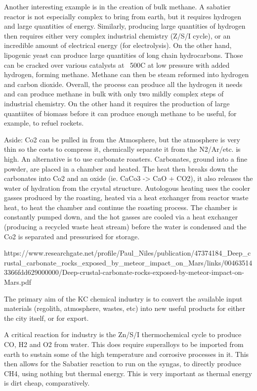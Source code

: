 \documentclass[10pt]{article}
\begin{document}
Another interesting example is in the creation of bulk methane. A sabatier reactor is not especially complex to bring from earth, but it requires hydrogen and large quantities of energy. Similarly, producing large quantities of hydrogen then requires either very complex industrial chemistry (Z/S/I cycle), or an incredible amount of electrical energy (for electrolysis). On the other hand, lipogenic yeast can produce large quantities of long chain hydrocarbons. Those can be cracked over various catalysts at ~500C at low pressure with added hydrogen, forming methane. Methane can then be steam reformed into hydrogen and carbon dioxide. Overall, the process can produce all the hydrogen it needs and can produce methane in bulk with only two mildly complex steps of industrial chemistry. On the other hand it requires the production of large quantiites of biomass before it can produce enough methane to be useful, for example, to refuel rockets.


Aside:
Co2 can be pulled in from the Atmosphere, but the atmosphere is very thin so the costs to compress it, chemically separate it from the N2/Ar/etc. is high. An alternative is to use carbonate roasters. Carbonates, ground into a fine powder, are placed in a chamber and heated. The heat then breaks down the carbonates into Co2 and an oxide (ie. CaCo3 -> CaO + CO2), it also releases the water of hydration from the crystal structure. Autologous heating uses the cooler gasses produced by the roasting, heated via a heat exchanger from reactor waste heat, to heat the chamber and continue the roasting process. The chamber is constantly pumped down, and the hot gasses are cooled via a heat exchanger (producing a recycled waste heat stream) before the water is condensed and the Co2 is separated and pressurised for storage.

https://www.researchgate.net/profile/Paul_Niles/publication/47374184_Deep_crustal_carbonate_rocks_exposed_by_meteor_impact_on_Mars/links/004635143366fdd629000000/Deep-crustal-carbonate-rocks-exposed-by-meteor-impact-on-Mars.pdf


The primary aim of the KC chemical industry is to convert the available input materials (regolith, atmosphere, wastes, etc) into new useful products for either the city itself, or for export.

A critical reaction for industry is the Zn/S/I thermochemical cycle to produce CO, H2 and O2 from water. This does require superalloys to be imported from earth to sustain some of the high temperature and corrosive processes in it. This then allows for the Sabatier reaction to run on the syngas, to directly produce CH4, using nothing but thermal energy. This is very important as thermal energy is dirt cheap, comparatively.
\end{document}
